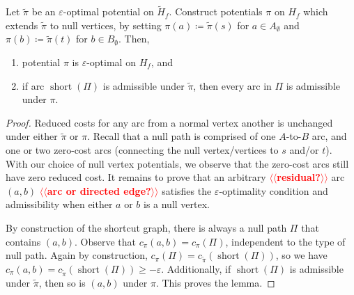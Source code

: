 \documentclass[a4paper,UKenglish]{socg-lipics-v2018}
\makeatletter
\def\note#1{\textcolor{red}{{#1}}}
\def\eps{\varepsilon}
\def\short{\operatorname{short}}
\theoremstyle{plain}
\numberwithin{figure}{section}
\def\EMPH#1{\textbf{\emph{\boldmath #1}}}
\def\n@te#1{\textsf{\boldmath \textbf{$\langle\!\langle$#1$\rangle\!\rangle$}}\leavevmode}
\def\note#1{\textcolor{red}{\n@te{#1}}}
\makeatother
\begin{document}
\begin{lemmarep}
\label{lemma:empty_correct}
Let \EMPH{$\tilde{\pi}$} be an $\eps$-optimal potential on $\tilde{H}_f$.
Construct potentials $\pi$ on $H_f$ which extends $\tilde{\pi}$ to null vertices, by
setting $\pi(a) \coloneqq \tilde{\pi}(s)$ for $a \in A_\emptyset$ and
$\pi(b) \coloneqq \tilde{\pi}(t)$ for $b \in B_\emptyset$.
Then,
\begin{enumerate}
\item potential $\pi$ is $\eps$-optimal on  $H_f$, and
\item if arc $\short(\Pi)$ is admissible under $\tilde{\pi}$, then every arc in $\Pi$ is admissible under $\pi$.
\end{enumerate}
\end{lemmarep}

\begin{proof}
Reduced costs for any arc from a normal vertex another is unchanged under either
$\tilde{\pi}$ or $\pi$.
Recall that a null path is comprised of one $A$-to-$B$ arc, and one or two
zero-cost arcs (connecting the null vertex/vertices to $s$ and/or $t$).
With our choice of null vertex potentials, we observe that the zero-cost arcs
still have zero reduced cost.
It remains to prove that an arbitrary \note{residual?} arc $(a, b)$ \note{arc or directed edge?} satisfies the $\eps$-optimality condition and admissibility when either $a$ or $b$ is a null vertex.

By construction of the shortcut graph,
there is always a null path $\Pi$ that contains $(a, b)$.
Observe that $c_\pi(a, b) = c_\pi(\Pi)$, independent to the type of null path.
Again by construction, $c_\pi(\Pi) = c_{\tilde{\pi}}(\short(\Pi))$, so we have
$c_\pi(a, b) = c_{\tilde{\pi}}(\short(\Pi)) \geq -\eps$.
Additionally, if $\short(\Pi)$ is admissible under $\tilde{\pi}$, then so is
$(a, b)$ under $\pi$.
%
This proves the lemma.
\end{proof}
\end{document}
